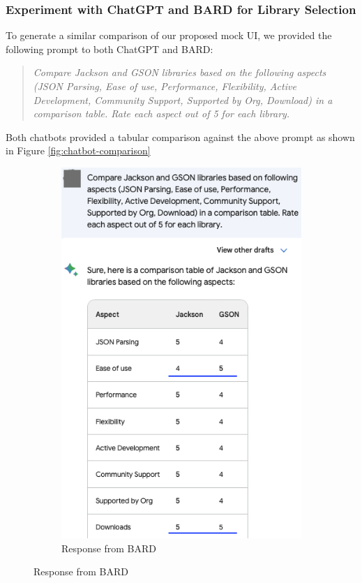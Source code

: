 \subsubsection{Experiment with ChatGPT and BARD for Library Selection}
To generate a similar comparison of our proposed mock UI, we provided the following prompt to both ChatGPT and BARD: 
\begin{quote}
  \textit{  Compare Jackson and GSON libraries based on the following aspects (JSON Parsing, Ease of use, Performance, Flexibility, Active Development, Community Support, Supported by Org, Download) in a comparison table. Rate each aspect out of 5 for each library.} 
\end{quote}
Both chatbots provided a tabular comparison against the above prompt as shown in Figure \ref{fig:chatbot-comparison}
\begin{figure}
    \centering
    \begin{subfigure}{.48\textwidth}
    \centering
        \includegraphics[scale=.5]{images/BARD-Response.png}
        \caption{Response from BARD}

\end{subfigure}
\end{figure}
